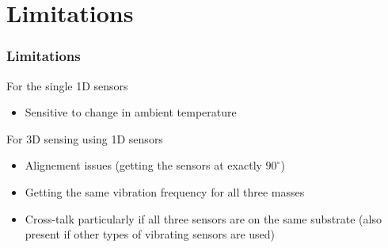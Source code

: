 \documentclass[10pt]{beamer}
\begin{document}
\section{Limitations}

\begin{frame}
\frametitle{Limitations}
    For the single 1D sensors
    \begin{itemize}
        \item Sensitive to change in ambient temperature
    \end{itemize}

    For 3D sensing using 1D sensors
    \begin{itemize}
        \item Alignement issues (getting the sensors at exactly $90^{\circ}$)
        \item Getting the same vibration frequency for all three masses
        \item Cross-talk particularly if all three sensors are on the same substrate (also present if other types of vibrating sensors are used)
    \end{itemize}
\end{frame}
\end{document}
